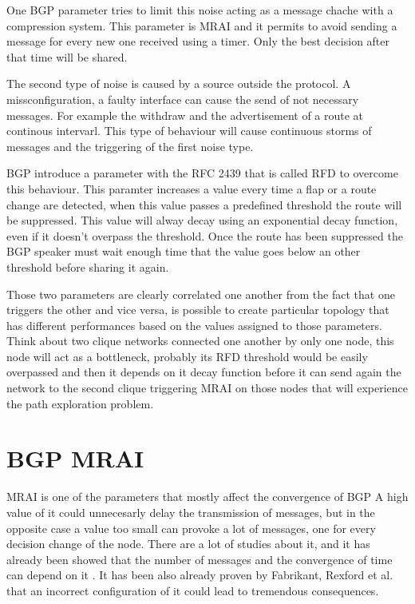 One \ac{BGP} parameter tries to limit this noise acting as a message chache with
a compression system.
This parameter is \ac{MRAI} and it permits to avoid sending a message for every
new one received using a timer.
Only the best decision after that time will be shared.

The second type of noise is caused by a source outside the protocol.
A missconfiguration, a faulty interface can cause the send of not necessary messages.
For example the withdraw and the advertisement of a route at continous intervarl.
This type of behaviour will cause continuous storms of messages and the triggering
of the first noise type.

\ac{BGP} introduce a parameter with the \ac{RFC} \num{2439} \cite{rfc2439} that
is called \ac{RFD} to overcome this behaviour.
This paramter increases a value every time a flap or a route change are detected,
when this value passes a predefined threshold the route will be suppressed.
This value will alway decay using an exponential decay function, even if it 
doesn't overpass the threshold.
Once the route has been suppressed the \ac{BGP} speaker must wait enough time
that the value goes below an other threshold before sharing it again.

Those two parameters are clearly correlated one another from the fact that
one triggers the other and vice versa, is possible to create particular topology
that has different performances based on the values assigned to those 
parameters.
Think about two clique networks connected one another by only one node, this
node will act as a bottleneck, probably its \ac{RFD} threshold would be easily
overpassed and then it depends on it decay function before it can send
again the network to the second clique triggering \ac{MRAI} on those nodes that
will experience the path exploration problem.

\section{BGP MRAI}
\label{sec:bgp_mrai}

\ac{MRAI} is one of the parameters that mostly affect the convergence of \ac{BGP}
A high value of it could unnecesarly delay the transmission of messages, but
in the opposite case a value too small can provoke a lot of messages, one for
every decision change of the node.
There are a lot of studies about it, and it has already been showed that
the number of messages and the convergence of time can depend on it \cite{griffin2001experimental}.
It has been also already proven by Fabrikant, Rexford et al. \cite{fabrikant2011there} 
that an incorrect configuration of it could lead to tremendous consequences.

